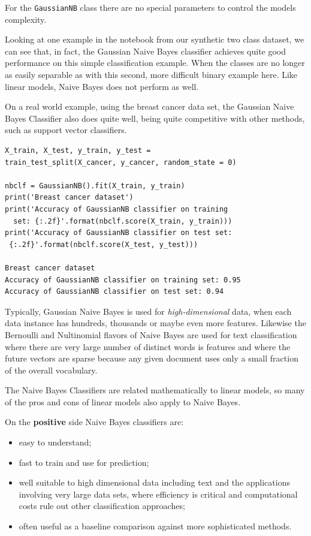 For the \texttt{GaussianNB} class there are no special parameters to control the models complexity. 

Looking at one example in the notebook from our synthetic two class dataset, we can see that, in fact, the Gaussian Naive Bayes classifier achieves quite good performance on this simple classification example. When the classes are no longer as easily separable as with this second, more difficult binary example here. Like linear models, Naive Bayes does not perform as well. 

On a real world example, using the breast cancer data set, the Gaussian Naive Bayes Classifier also does quite well, being quite competitive with other methods, such as support vector classifiers. 

{\scriptsize
\begin{verbatim}
X_train, X_test, y_train, y_test = 
train_test_split(X_cancer, y_cancer, random_state = 0)

nbclf = GaussianNB().fit(X_train, y_train)
print('Breast cancer dataset')
print('Accuracy of GaussianNB classifier on training 
  set: {:.2f}'.format(nbclf.score(X_train, y_train)))
print('Accuracy of GaussianNB classifier on test set:
 {:.2f}'.format(nbclf.score(X_test, y_test)))

Breast cancer dataset
Accuracy of GaussianNB classifier on training set: 0.95
Accuracy of GaussianNB classifier on test set: 0.94
\end{verbatim}
}

Typically, Gaussian Naive Bayes is used for \emph{high-dimensional} data, when each data instance has hundreds, thousands or maybe even more features. Likewise the Bernoulli and Nultinomial flavors of Naive Bayes are used for text classification where there are very large number of distinct words is features and where the future vectors are sparse because any given document uses only a small fraction of the overall vocabulary. 

The Naive Bayes Classifiers are related mathematically to linear models, so many of the pros and cons of linear models also apply to Naive Bayes. 

On the \textbf{positive} side Naive Bayes classifiers are:
\begin{itemize}
\item easy to understand;
\item fast to train and use for prediction;
\item well suitable to high dimensional data including text and the applications involving very large data sets, where efficiency is critical and computational costs rule out other classification approaches;
\item often useful as a baseline comparison against more sophisticated methods.
\end{itemize}


